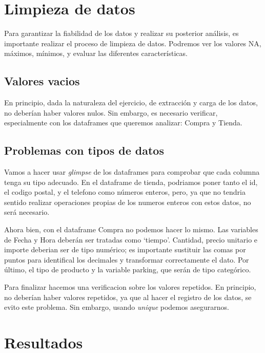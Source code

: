 \documentclass[
]{article}
\begin{document}
\section{Limpieza de datos}\label{limpieza-de-datos}

Para garantizar la fiabilidad de los datos y realizar su posterior análisis, es importante realizar el proceso de limpieza de datos. Podremos ver los valores NA, máximos, mínimos, y evaluar las diferentes características.

\subsection{Valores vacios}\label{valores-vacios}

En principio, dada la naturaleza del ejercicio, de extracción y carga de los datos, no deberían haber valores nulos. Sin embargo, es necesario verificar, especialmente con los dataframes que queremos analizar: Compra y Tienda.

\subsection{Problemas con tipos de datos}\label{problemas-con-tipos-de-datos}

Vamos a hacer usar \emph{glimpse} de los dataframes para comprobar que cada columna tenga su tipo adecuado. En el dataframe de tienda, podriamos poner tanto el id, el codigo postal, y el telefono como números enteros, pero, ya que no tendria sentido realizar operaciones propias de los numeros enteros con estos datos, no será necesario.

Ahora bien, con el dataframe Compra no podemos hacer lo mismo. Las variables de Fecha y Hora deberán ser tratadas como `tiempo'. Cantidad, precio unitario e importe deberian ser de tipo numérico; es importante sustituir las comas por puntos para identifical los decimales y transformar correctamente el dato. Por último, el tipo de producto y la variable parking, que serán de tipo categórico.

Para finalizar hacemos una verificacion sobre los valores repetidos. En principio, no deberían haber valores repetidos, ya que al hacer el registro de los datos, se evito este problema. Sin embargo, usando \emph{unique} podemos asegurarnos.

\section{Resultados}\label{resultados}
\end{document}
